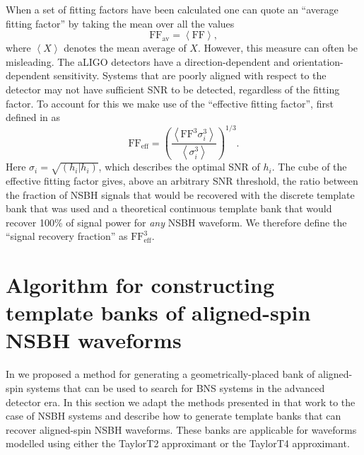 When a set of fitting factors have been calculated one can quote an ``average 
fitting factor'' by taking the mean over all the values
%
\begin{equation}
 \textrm{FF}_{\textrm{av}} =  \left\langle \textrm{FF}
\right\rangle,
\end{equation}
%
where $\left\langle X \right\rangle$ denotes the mean average of $X$.
However, this measure can often be misleading.
The \ac{aLIGO} detectors have a direction-dependent and
orientation-dependent sensitivity. Systems that are poorly aligned with respect
to the detector may not have sufficient \ac{SNR} to be detected, regardless of
the fitting factor.
To account for this we make use of the ``effective fitting factor'',
first defined in \cite{Buonanno:2002fy} as
%
\begin{equation}
 \textrm{FF}_{\textrm{eff}} = \left( 
 \frac{ \left\langle \textrm{FF}^3 \sigma_i^3 \right\rangle }{\left\langle
\sigma_i^3 \right\rangle} \right)^{1/3}.
\end{equation}
%
Here $\sigma_i = \sqrt{(h_i|h_i)}$, which describes the optimal \ac{SNR}
of $h_i$. The cube of the effective fitting factor gives, above an
arbitrary \ac{SNR} threshold, the ratio between the fraction of \ac{NSBH}
signals that would be recovered with the discrete template bank that was used
and a theoretical continuous template bank that would recover 100\% of signal
power for \emph{any} \ac{NSBH} waveform. We therefore define the ``signal
recovery fraction'' as $\textrm{FF}_{\textrm{eff}}^3$.

\section{Algorithm for constructing template banks of aligned-spin NSBH 
waveforms}
\label{sec:bank_method}

In \cite{Brown:2012qf} we proposed a method for generating a
geometrically-placed bank of aligned-spin
systems that can be used to search for \ac{BNS} systems in the advanced detector
era. In this section we adapt the methods presented in that work to the case of
\ac{NSBH} systems and describe how to generate template banks that can recover
aligned-spin \ac{NSBH} waveforms. These banks are applicable for waveforms
modelled using either the TaylorT2 approximant or the TaylorT4 approximant.

